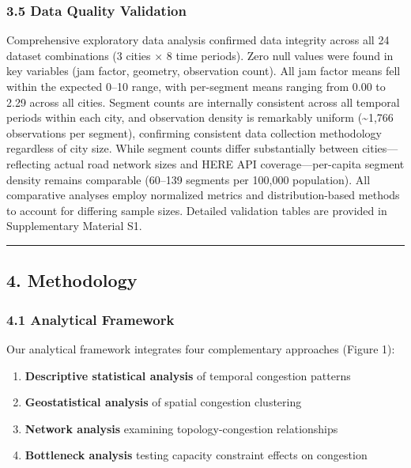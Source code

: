 \subsubsection{3.5 Data Quality Validation}\label{data-quality-validation}

Comprehensive exploratory data analysis confirmed data integrity across all 24 dataset combinations (3 cities × 8 time periods). Zero null values were found in key variables (jam factor, geometry, observation count). All jam factor means fell within the expected 0--10 range, with per-segment means ranging from 0.00 to 2.29 across all cities. Segment counts are internally consistent across all temporal periods within each city, and observation density is remarkably uniform (\textasciitilde1,766 observations per segment), confirming consistent data collection methodology regardless of city size. While segment counts differ substantially between cities---reflecting actual road network sizes and HERE API coverage---per-capita segment density remains comparable (60--139 segments per 100,000 population). All comparative analyses employ normalized metrics and distribution-based methods to account for differing sample sizes. Detailed validation tables are provided in Supplementary Material S1.

\begin{center}\rule{0.5\linewidth}{0.5pt}\end{center}

\subsection{4. Methodology}\label{methodology}

\subsubsection{4.1 Analytical Framework}\label{analytical-framework}

Our analytical framework integrates four complementary approaches (Figure 1):

\begin{enumerate}
\def\labelenumi{\arabic{enumi}.}
\tightlist
\item
  \textbf{Descriptive statistical analysis} of temporal congestion patterns
\item
  \textbf{Geostatistical analysis} of spatial congestion clustering
\item
  \textbf{Network analysis} examining topology-congestion relationships
\item
  \textbf{Bottleneck analysis} testing capacity constraint effects on congestion
\end{enumerate}

